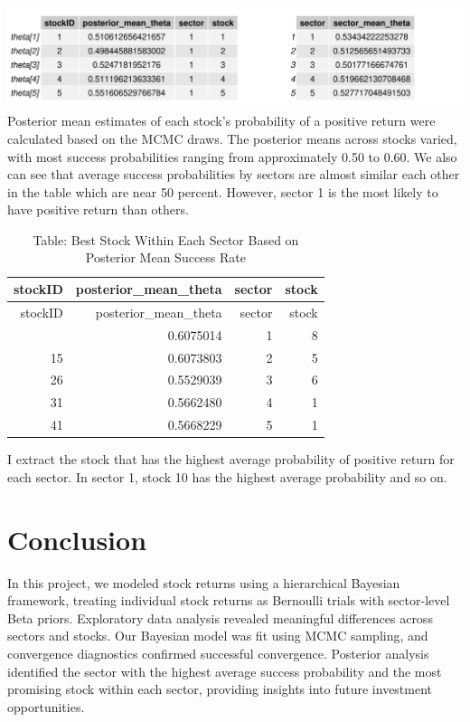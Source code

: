 \documentclass[
  11pt,
]{article}
\begin{document}
\includegraphics{Final-Project_files/figure-latex/unnamed-chunk-7-1.pdf}
Posterior mean estimates of each stock's probability of a positive
return were calculated based on the MCMC draws. The posterior means
across stocks varied, with most success probabilities ranging from
approximately 0.50 to 0.60. We also can see that average success
probabilities by sectors are almost similar each other in the table
which are near 50 percent. However, sector 1 is the most likely to have
positive return than others.

\begin{longtable}[]{@{}rrrr@{}}
\caption{Table: Best Stock Within Each Sector Based on Posterior Mean
Success Rate}\tabularnewline
\toprule\noalign{}
stockID & posterior\_mean\_theta & sector & stock \\
\midrule\noalign{}
\endfirsthead
\toprule\noalign{}
stockID & posterior\_mean\_theta & sector & stock \\
\midrule\noalign{}
\endhead
\bottomrule\noalign{}
\endlastfoot
8 & 0.6075014 & 1 & 8 \\
15 & 0.6073803 & 2 & 5 \\
26 & 0.5529039 & 3 & 6 \\
31 & 0.5662480 & 4 & 1 \\
41 & 0.5668229 & 5 & 1 \\
\end{longtable}

I extract the stock that has the highest average probability of positive
return for each sector. In sector 1, stock 10 has the highest average
probability and so on.

\section{Conclusion}\label{conclusion}

In this project, we modeled stock returns using a hierarchical Bayesian
framework, treating individual stock returns as Bernoulli trials with
sector-level Beta priors. Exploratory data analysis revealed meaningful
differences across sectors and stocks. Our Bayesian model was fit using
MCMC sampling, and convergence diagnostics confirmed successful
convergence. Posterior analysis identified the sector with the highest
average success probability and the most promising stock within each
sector, providing insights into future investment opportunities.
\end{document}

